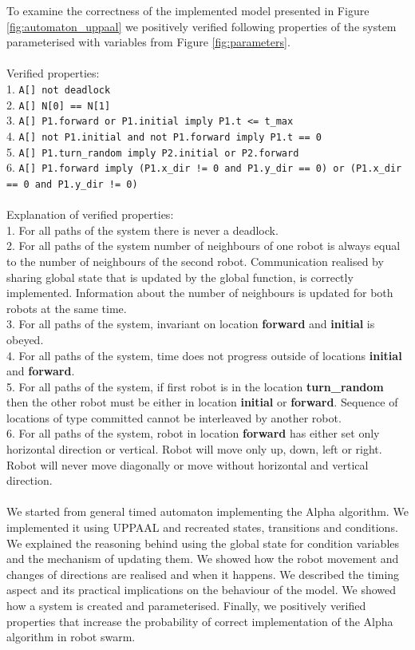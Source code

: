\noindent
To examine the correctness of the implemented model presented in Figure \ref{fig:automaton_uppaal} we positively verified following properties of the system parameterised with variables from Figure \ref{fig:parameters}.\\\\
Verified properties:\\
1. \texttt{A[] not deadlock}\\
2. \texttt{A[] N[0] == N[1]}\\
3. \texttt{A[] P1.forward or P1.initial imply P1.t <= t\_max}\\
4. \texttt{A[] not P1.initial and not P1.forward imply P1.t == 0}\\
5. \texttt{A[] P1.turn\_random imply P2.initial or P2.forward}\\
6. \texttt{A[] P1.forward imply (P1.x\_dir != 0 and P1.y\_dir == 0) or (P1.x\_dir == 0 and P1.y\_dir != 0)}\\\\
Explanation of verified properties:\\
1. For all paths of the system there is never a deadlock.\\
2. For all paths of the system number of neighbours of one robot is always equal to the number of neighbours of the second robot. Communication realised by sharing global state that is updated by the global function, is correctly implemented. Information about the number of neighbours is updated for both robots at the same time.\\
3. For all paths of the system, invariant on location \textbf{forward} and \textbf{initial} is obeyed.\\
4. For all paths of the system, time does not progress outside of locations \textbf{initial} and \textbf{forward}.\\
5. For all paths of the system, if first robot is in the location \textbf{turn\_random} then the other robot must be either in location \textbf{initial} or \textbf{forward}. Sequence of locations of type committed cannot be interleaved by another robot.\\
6. For all paths of the system, robot in location \textbf{forward} has either set only horizontal direction or vertical. Robot will move only up, down, left or right. Robot will never move diagonally or move without horizontal and vertical direction.\\\\
\noindent
We started from general timed automaton implementing the Alpha algorithm. We implemented it using UPPAAL and recreated states, transitions and conditions. We explained the reasoning behind using the global state for condition variables and the mechanism of updating them. We showed how the robot movement and changes of directions are realised and when it happens. We described the timing aspect and its practical implications on the behaviour of the model. We showed how a system is created and parameterised. Finally, we positively verified properties that increase the probability of correct implementation of the Alpha algorithm in robot swarm.